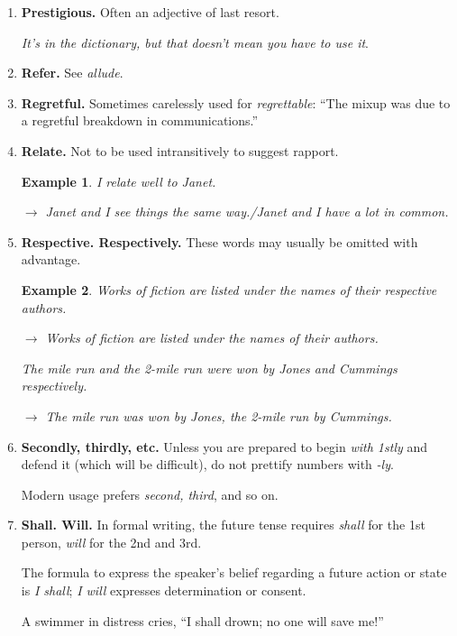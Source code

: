 \documentclass{book}
\numberwithin{equation}{section}
\newtheorem{example}{Example}[chapter]
\begin{document}
\begin{enumerate}
    Because of this ambiguity it is best restricted to the 1st meaning: ``She'll be here presently'' (``soon,'' or ``in a short time'').
    \item \textbf{Prestigious.} Often an adjective of last resort.
    
    \textit{It's in the dictionary, but that doesn't mean you have to use it}.
    \item \textbf{Refer.} See \textit{allude}.
    \item \textbf{Regretful.} Sometimes carelessly used for \textit{regrettable}: ``The mixup was due to a regretful breakdown in communications.''
    \item \textbf{Relate.} Not to be used intransitively to suggest rapport.
    \begin{example}
        I relate well to Janet.
        
        $\to$ Janet and I see things the same way./Janet and I have a lot in common.
    \end{example}
    \item \textbf{Respective. Respectively.} These words may usually be omitted with advantage.
    \begin{example}
        Works of fiction are listed under the names of their respective authors.
        
        $\to$ Works of fiction are listed under the names of their authors.
        
        The mile run and the 2-mile run were won by Jones and Cummings respectively.
        
        $\to$ The mile run was won by Jones, the 2-mile run by Cummings.
    \end{example}
    \item \textbf{Secondly, thirdly, etc.} Unless you are prepared to begin \textit{with 1stly} and defend it (which will be difficult), do not prettify numbers with \textit{-ly}.
    
    Modern usage prefers \textit{second, third}, and so on.
    \item \textbf{Shall. Will.} In formal writing, the future tense requires \textit{shall} for the 1st person, \textit{will} for the 2nd and 3rd.
    
    The formula to express the speaker's belief regarding a future action or state is \textit{I shall}; \textit{I will} expresses determination or consent.
    
    A swimmer in distress cries, ``I shall drown; no one will save me!''
    

\end{enumerate}
\end{document}
